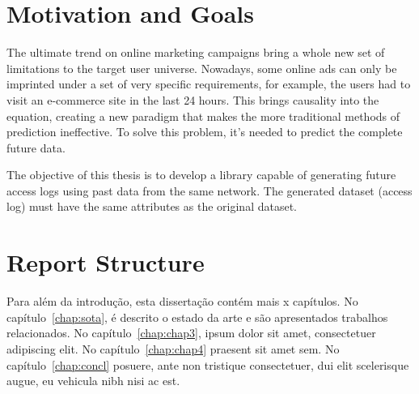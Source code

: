 \section{Motivation and Goals} \label{sec:goals}

The ultimate trend on online marketing campaigns bring a whole new set of limitations to the target user universe. Nowadays, some online ads can only
be imprinted under a set of very specific requirements, for example, the users had to visit an e-commerce site in the last 24 hours. 
This brings causality into the equation, creating a new paradigm that makes 
the more traditional methods of prediction ineffective. To solve this problem, it's needed to predict the complete future data.

The objective of this thesis is to develop a library capable of generating future access logs using past data from the same network.
The generated dataset (access log) must have the same attributes as the original dataset.

\section{Report Structure} \label{sec:struct}

Para além da introdução, esta dissertação contém mais x capítulos.
No capítulo~\ref{chap:sota}, é descrito o estado da arte e são
apresentados trabalhos relacionados. 
No capítulo~\ref{chap:chap3}, ipsum dolor sit amet, consectetuer
adipiscing elit.
No capítulo~\ref{chap:chap4} praesent sit amet sem. 
No capítulo~\ref{chap:concl}  posuere, ante non tristique
consectetuer, dui elit scelerisque augue, eu vehicula nibh nisi ac
est. 

